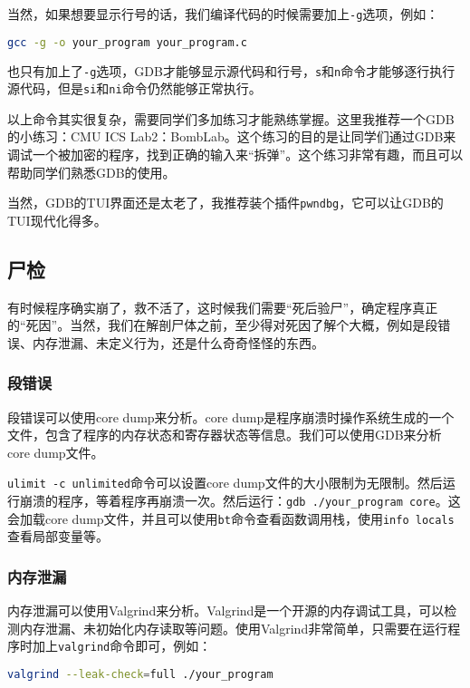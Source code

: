 \documentclass[../main.tex]{subfiles}
\begin{document}
当然，如果想要显示行号的话，我们编译代码的时候需要加上\texttt{-g}选项，例如：
\begin{lstlisting}[language=bash]
    gcc -g -o your_program your_program.c
\end{lstlisting}
也只有加上了\texttt{-g}选项，GDB才能够显示源代码和行号，\texttt{s}和\texttt{n}命令才能够逐行执行源代码，但是\texttt{si}和\texttt{ni}命令仍然能够正常执行。

以上命令其实很复杂，需要同学们多加练习才能熟练掌握。这里我推荐一个GDB的小练习：CMU ICS Lab2：BombLab。这个练习的目的是让同学们通过GDB来调试一个被加密的程序，找到正确的输入来“拆弹”。这个练习非常有趣，而且可以帮助同学们熟悉GDB的使用。

当然，GDB的TUI界面还是太老了，我推荐装个插件\texttt{pwndbg}，它可以让GDB的TUI现代化得多。

\subsection{尸检}

有时候程序确实崩了，救不活了，这时候我们需要“死后验尸”，确定程序真正的“死因”。当然，我们在解剖尸体之前，至少得对死因了解个大概，例如是段错误、内存泄漏、未定义行为，还是什么奇奇怪怪的东西。

\subsubsection{段错误}

段错误可以使用core dump来分析。core dump是程序崩溃时操作系统生成的一个文件，包含了程序的内存状态和寄存器状态等信息。我们可以使用GDB来分析core dump文件。

\texttt{ulimit -c unlimited}命令可以设置core dump文件的大小限制为无限制。然后运行崩溃的程序，等着程序再崩溃一次。然后运行：\texttt{gdb ./your\_program core}。这会加载core dump文件，并且可以使用\texttt{bt}命令查看函数调用栈，使用\texttt{info locals}查看局部变量等。

\subsubsection{内存泄漏}

内存泄漏可以使用Valgrind来分析。Valgrind是一个开源的内存调试工具，可以检测内存泄漏、未初始化内存读取等问题。使用Valgrind非常简单，只需要在运行程序时加上\texttt{valgrind}命令即可，例如：
\begin{lstlisting}[language=bash]
    valgrind --leak-check=full ./your_program
\end{lstlisting}
\end{document}
